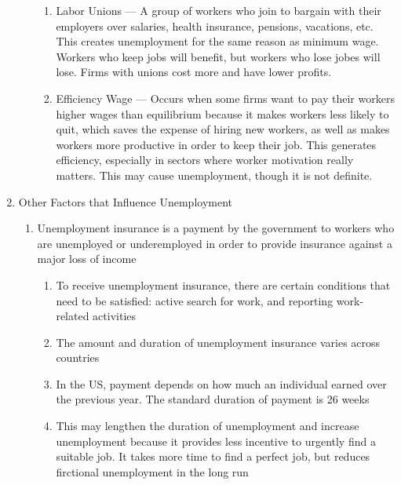 \documentclass[12pt]{article}
\begin{document}
\begin{enumerate}
\begin{enumerate}
\begin{enumerate}
              \item Labor Unions — A group of workers who join to bargain with their employers over salaries, health insurance, pensions, vacations, etc. This creates unemployment for the same reason as minimum wage. Workers who keep jobs will benefit, but workers who lose jobes will lose. Firms with unions cost more and have lower profits.

              \item Efficiency Wage — Occurs when some firms want to pay their workers higher wages than equilibrium because it makes workers less likely to quit, which saves the expense of hiring new workers, as well as makes workers more productive in order to keep their job. This generates efficiency, especially in sectors where worker motivation really matters. This may cause unemployment, though it is not definite.

            \end{enumerate}

        \end{enumerate}

      \item Other Factors that Influence Unemployment

        \begin{enumerate}

          \item Unemployment insurance is a payment by the government to workers who are unemployed or underemployed in order to provide insurance against a major loss of income

            \begin{enumerate}

              \item To receive unemployment insurance, there are certain conditions that need to be satisfied: active search for work, and reporting work-related activities

              \item The amount and duration of unemployment insurance varies across countries

              \item In the US, payment depends on how much an individual earned over the previous year. The standard duration of payment is 26 weeks

              \item This may lengthen the duration of unemployment and increase unemployment because it provides less incentive to urgently find a suitable job. It takes more time to find a perfect job, but reduces firctional unemployment in the long run


\end{enumerate}
\end{enumerate}
\end{enumerate}
\end{document}
